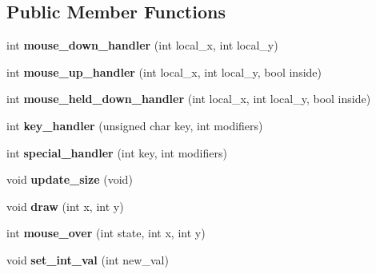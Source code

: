 \subsection*{Public Member Functions}
\begin{DoxyCompactItemize}
\item 
\hypertarget{classGLUI__Listbox_aaf335e290bd8367d40a9b868faa8be1c}{int {\bfseries mouse\-\_\-down\-\_\-handler} (int local\-\_\-x, int local\-\_\-y)}\label{classGLUI__Listbox_aaf335e290bd8367d40a9b868faa8be1c}

\item 
\hypertarget{classGLUI__Listbox_a565e196711dad776a2a6f4afa035d25a}{int {\bfseries mouse\-\_\-up\-\_\-handler} (int local\-\_\-x, int local\-\_\-y, bool inside)}\label{classGLUI__Listbox_a565e196711dad776a2a6f4afa035d25a}

\item 
\hypertarget{classGLUI__Listbox_a425b2552f8e430d19157410681abc91c}{int {\bfseries mouse\-\_\-held\-\_\-down\-\_\-handler} (int local\-\_\-x, int local\-\_\-y, bool inside)}\label{classGLUI__Listbox_a425b2552f8e430d19157410681abc91c}

\item 
\hypertarget{classGLUI__Listbox_ac3a007ee056e377322d3a8d6ad0478c4}{int {\bfseries key\-\_\-handler} (unsigned char key, int modifiers)}\label{classGLUI__Listbox_ac3a007ee056e377322d3a8d6ad0478c4}

\item 
\hypertarget{classGLUI__Listbox_ab1efa64fe3a73dc5d62ebc540acac2d5}{int {\bfseries special\-\_\-handler} (int key, int modifiers)}\label{classGLUI__Listbox_ab1efa64fe3a73dc5d62ebc540acac2d5}

\item 
\hypertarget{classGLUI__Listbox_a32bf6c1b068e2af4466a19f797693c8d}{void {\bfseries update\-\_\-size} (void)}\label{classGLUI__Listbox_a32bf6c1b068e2af4466a19f797693c8d}

\item 
\hypertarget{classGLUI__Listbox_a279c78e74bcba99d067633a9dc39b878}{void {\bfseries draw} (int x, int y)}\label{classGLUI__Listbox_a279c78e74bcba99d067633a9dc39b878}

\item 
\hypertarget{classGLUI__Listbox_af44915fea3045f58deffc37e65cea112}{int {\bfseries mouse\-\_\-over} (int state, int x, int y)}\label{classGLUI__Listbox_af44915fea3045f58deffc37e65cea112}

\item 
\hypertarget{classGLUI__Listbox_a82ef5939f83cacb4c3f80790fa5962ef}{void {\bfseries set\-\_\-int\-\_\-val} (int new\-\_\-val)}\label{classGLUI__Listbox_a82ef5939f83cacb4c3f80790fa5962ef}


\end{DoxyCompactItemize}
